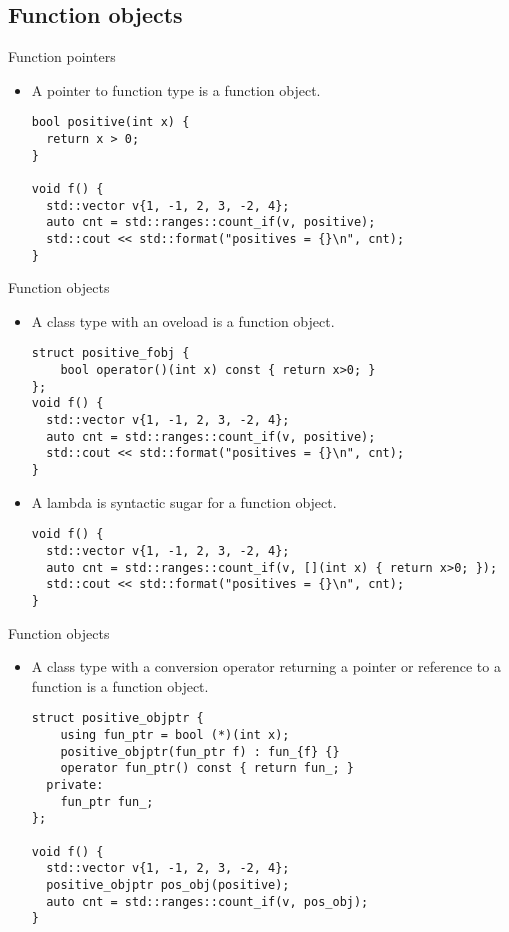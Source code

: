 \subsection{Function objects}

\begin{frame}[t,fragile]{Function pointers}
\begin{itemize}
   \item A pointer to function type is a function object.
\begin{lstlisting}
bool positive(int x) { 
  return x > 0; 
}

void f() {
  std::vector v{1, -1, 2, 3, -2, 4};
  auto cnt = std::ranges::count_if(v, positive);
  std::cout << std::format("positives = {}\n", cnt);
}
\end{lstlisting}
\end{itemize}
\end{frame}

\begin{frame}[t,fragile]{Function objects}
\begin{itemize}
  \item A class type with an  oveload is a function object.
\begin{lstlisting}
struct positive_fobj {
    bool operator()(int x) const { return x>0; }
};
void f() {
  std::vector v{1, -1, 2, 3, -2, 4};
  auto cnt = std::ranges::count_if(v, positive);
  std::cout << std::format("positives = {}\n", cnt);
}
\end{lstlisting}

  \item A lambda is syntactic sugar for a function object.
\begin{lstlisting}
void f() {
  std::vector v{1, -1, 2, 3, -2, 4};
  auto cnt = std::ranges::count_if(v, [](int x) { return x>0; });
  std::cout << std::format("positives = {}\n", cnt);
}
\end{lstlisting}

\end{itemize}
\end{frame}

\begin{frame}[t,fragile]{Function objects}
\begin{itemize}
  \item A class type with a conversion operator returning a pointer or reference
        to a function is a function object.
\begin{lstlisting}
struct positive_objptr {
    using fun_ptr = bool (*)(int x);
    positive_objptr(fun_ptr f) : fun_{f} {}
    operator fun_ptr() const { return fun_; }
  private:
    fun_ptr fun_;
};

void f() {
  std::vector v{1, -1, 2, 3, -2, 4};
  positive_objptr pos_obj(positive);
  auto cnt = std::ranges::count_if(v, pos_obj);
}
\end{lstlisting}

\end{itemize}
\end{frame}
